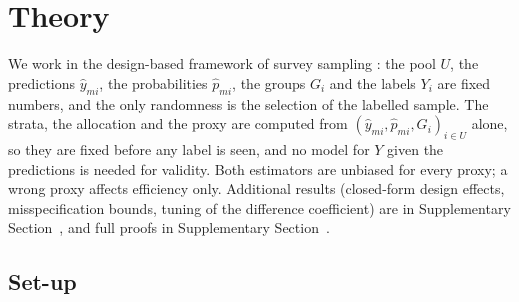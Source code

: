 \section{Theory}\label{sec:theory}

We work in the design-based framework of survey sampling \citep{cochran1977,sarndal1992}: the pool $U$,
the predictions $\hat y_{mi}$, the probabilities $\hat p_{mi}$, the groups $G_i$ and the labels $Y_i$ are fixed
numbers, and the only randomness is the selection of the labelled sample. The strata, the allocation and
the proxy are computed from $(\hat y_{mi},\hat p_{mi},G_i)_{i\in U}$ alone, so they are fixed before any label is seen,
and no model for $Y$ given the predictions is needed for validity. Both estimators are unbiased for every proxy; a wrong
proxy affects efficiency only. Additional results (closed-form design effects, misspecification bounds,
tuning of the difference coefficient) are in Supplementary Section~, and full proofs in
Supplementary Section~.

\subsection{Set-up}\label{sec:theory-setup}

